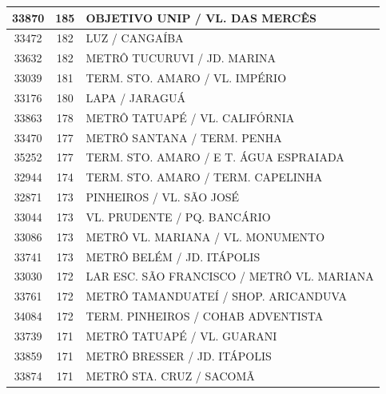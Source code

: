 \documentclass[
	12pt,				%
	oneside,			%
	a4paper,			%
	english,			%
	brazil				%
	]{abntex2ppgsi}
\begin{document}
\begin{apendicesenv}
\begin{longtable}{c|c|p{7cm}}
    33870 & 185   & OBJETIVO UNIP / VL. DAS MERCÊS \\
\hline

    33472 & 182   & LUZ / CANGAÍBA \\
\hline

    33632 & 182   & METRÔ TUCURUVI / JD. MARINA \\
\hline

    33039 & 181   & TERM. STO. AMARO / VL. IMPÉRIO \\
\hline

    33176 & 180   & LAPA / JARAGUÁ \\
\hline

    33863 & 178   & METRÔ TATUAPÉ / VL. CALIFÓRNIA \\
\hline

    33470 & 177   & METRÔ SANTANA / TERM. PENHA \\
\hline

    35252 & 177   & TERM. STO. AMARO / E T. ÁGUA ESPRAIADA \\
\hline

    32944 & 174   & TERM. STO. AMARO / TERM. CAPELINHA \\
\hline

    32871 & 173   & PINHEIROS / VL. SÃO JOSÉ \\
\hline

    33044 & 173   & VL. PRUDENTE / PQ. BANCÁRIO \\
\hline

    33086 & 173   & METRÔ VL. MARIANA / VL. MONUMENTO \\
\hline

    33741 & 173   & METRÔ BELÉM / JD. ITÁPOLIS \\
\hline

    33030 & 172   & LAR ESC. SÃO FRANCISCO / METRÔ VL. MARIANA \\
\hline

    33761 & 172   & METRÔ TAMANDUATEÍ / SHOP. ARICANDUVA \\
\hline

    34084 & 172   & TERM. PINHEIROS / COHAB ADVENTISTA \\
\hline

    33739 & 171   & METRÔ TATUAPÉ / VL. GUARANI \\
\hline

    33859 & 171   & METRÔ BRESSER / JD. ITÁPOLIS \\
\hline

    33874 & 171   & METRÔ STA. CRUZ / SACOMÃ \\
\hline


\end{longtable}
\end{apendicesenv}
\end{document}
